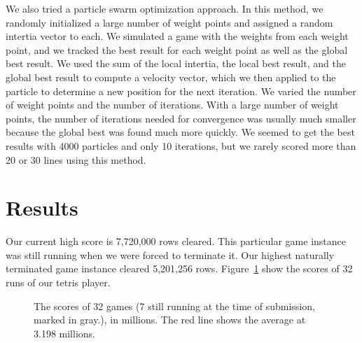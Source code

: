 \documentclass[12pt, twocolumn]{article}
\begin{document}
We also tried a particle swarm optimization approach. In this method, we randomly initialized a large number of weight points and assigned a random intertia vector to each. We simulated a game with the weights from each weight point, and we tracked the best result for each weight point as well as the global best result. We used the sum of the local intertia, the local best result, and the global best result to compute a velocity vector, which we then applied to the particle to determine a new position for the next iteration. We varied the number of weight points and the number of iterations. With a large number of weight points, the number of iterations needed for convergence was usually much smaller because the global best was found much more quickly. We seemed to get the best results with 4000 particles and only 10 iterations, but we rarely scored more than 20 or 30 lines using this method.

\section*{Results}

Our current high score is 7,720,000 rows cleared. This particular game instance was still running when we were forced to terminate it. Our highest naturally terminated game instance cleared 5,201,256 rows. Figure~\ref{fig:res} show the
scores of 32 runs of our tetris player.

\begin{figure}
\centering
{}
\caption{The scores of 32 games (7 still running at the time of submission,
         marked in gray.), in millions. The red line shows the average at 3.198
         millions.}
\label{fig:res}
\end{figure}
\end{document}
